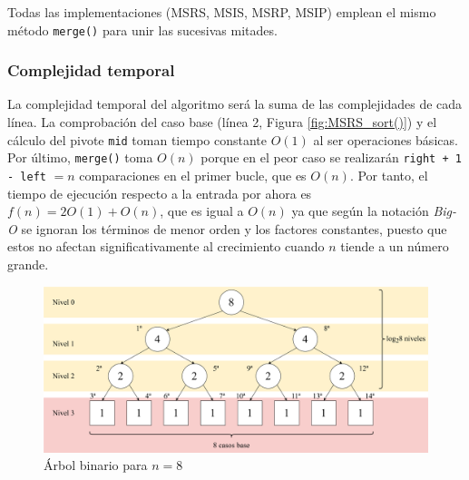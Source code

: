\documentclass[titlepage]{article}
\begin{document}
Todas las implementaciones (MSRS, MSIS, MSRP, MSIP) emplean el mismo método \lstinline|merge()| para unir las sucesivas mitades.

\subsubsection{Complejidad temporal} %

La complejidad temporal del algoritmo será la suma de las complejidades de cada línea. La comprobación del caso base (línea 2, Figura \ref{fig:MSRS_sort()}) y el cálculo del pivote \lstinline|mid| toman tiempo constante \(O(1)\) al ser operaciones básicas. Por último, \lstinline|merge()| toma \(O(n)\) porque en el peor caso se realizarán \lstinline|right + 1 - left| \(=n\) comparaciones en el primer bucle, que es \(O(n)\). Por tanto, el tiempo de ejecución respecto a la entrada por ahora es \(f(n) = 2O(1) + O(n)\), que es igual a \(O(n)\) ya que según la notación \textit{Big-O} se ignoran los términos de menor orden y los factores constantes, puesto que estos no afectan significativamente al crecimiento cuando \(n\) tiende a un número grande.

\begin{figure}[hbtp]
    \centering
    \includegraphics[width=0.8\linewidth]{Diagrames/arbolBinarioMSRSn8.png}
    \caption{Árbol binario para \(n=8\)}
    \label{fig:arbol-MSRS-N=8}
\end{figure}
\end{document}
